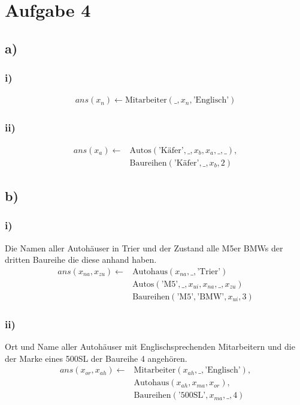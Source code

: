 \pagebreak
\section*{Aufgabe 4}
\subsection*{a)}
\subsubsection*{i)}
\begin{align*}
  ans(x_n) \leftarrow \text{Mitarbeiter}(\_,x_n,\text{'Englisch'})
\end{align*}
\subsubsection*{ii)}
\begin{align*}
  ans(x_a) \leftarrow &\text{Autos}(\text{'Käfer'},\_,x_b,x_a,\_,\_), \\
                      &\text{Baureihen}(\text{'Käfer'},\_,x_b,2)
\end{align*}
\subsection*{b)}
\subsubsection*{i)}
Die Namen aller Autohäuser in Trier und der Zustand alle M5er BMWs der dritten Baureihe die diese anhand haben.
\begin{align*}
  ans(x_{na},x _{ zu } ) \leftarrow &\text{Autohaus}(x _{ na } ,\_,\text{'Trier'}) \\
                                    &\text{Autos}(\text{'M5'},\_,x _{ ui } ,x _{ na } ,\_,x _{ zu } ) \\
                                    &\text{Baureihen}(\text{'M5'},\text{'BMW'},x _{ ui } ,3)
\end{align*}
\subsubsection*{ii)}
Ort und Name aller Autohäuser mit Englischsprechenden Mitarbeitern und die der Marke eines 500SL der Baureihe 4 angehören.
\begin{align*}
  ans(x_{or},x _{ ah } ) \leftarrow &\text{Mitarbeiter}(x _{ ah } ,\_,\text{'Englisch'}), \\
                                    &\text{Autohaus}(x _{ ah } , x _{ ma } , x _{ or } ), \\
                                    &\text{Baureihen}(\text{'500SL'}, x _{ ma } , \_, 4)
\end{align*}

